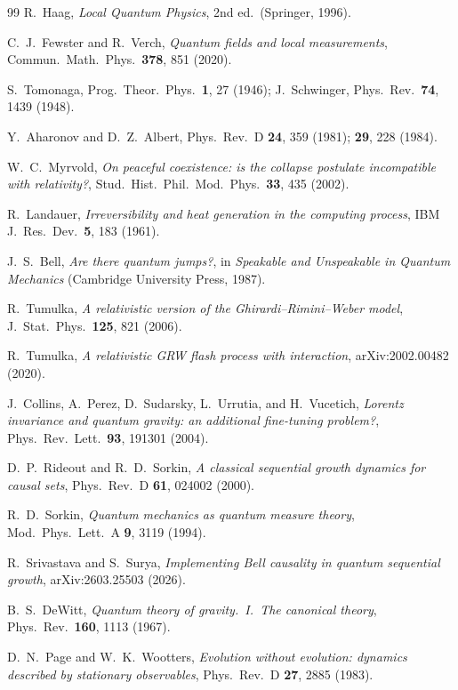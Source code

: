 \documentclass[11pt,a4paper]{article}
\theoremstyle{definition}
\theoremstyle{plain}
\theoremstyle{remark}
\begin{document}
\begin{thebibliography}{99}
 R.~Haag, \emph{Local Quantum Physics}, 2nd ed.\ (Springer,
1996).

 C.~J.~Fewster and R.~Verch, \emph{Quantum fields
and local measurements}, Commun.\ Math.\ Phys.\ \textbf{378}, 851 (2020).

 S.~Tomonaga, Prog.\ Theor.\ Phys.\ \textbf{1}, 27
(1946); J.~Schwinger, Phys.\ Rev.\ \textbf{74}, 1439 (1948).

 Y.~Aharonov and D.~Z.~Albert, Phys.\ Rev.\ D
\textbf{24}, 359 (1981); \textbf{29}, 228 (1984).

 W.~C.~Myrvold, \emph{On peaceful coexistence: is the
collapse postulate incompatible with relativity?}, Stud.\ Hist.\ Phil.\
Mod.\ Phys.\ \textbf{33}, 435 (2002).

 R.~Landauer, \emph{Irreversibility and heat generation
in the computing process}, IBM J.\ Res.\ Dev.\ \textbf{5}, 183 (1961).

 J.~S.~Bell, \emph{Are there quantum jumps?}, in
\emph{Speakable and Unspeakable in Quantum Mechanics} (Cambridge
University Press, 1987).

 R.~Tumulka, \emph{A relativistic version of the
Ghirardi--Rimini--Weber model}, J.\ Stat.\ Phys.\ \textbf{125}, 821
(2006).

 R.~Tumulka, \emph{A relativistic GRW flash process
with interaction}, arXiv:2002.00482 (2020).

 J.~Collins, A.~Perez, D.~Sudarsky, L.~Urrutia, and
H.~Vucetich, \emph{Lorentz invariance and quantum gravity: an additional
fine-tuning problem?}, Phys.\ Rev.\ Lett.\ \textbf{93}, 191301 (2004).

 D.~P.~Rideout and R.~D.~Sorkin, \emph{A classical
sequential growth dynamics for causal sets}, Phys.\ Rev.\ D \textbf{61},
024002 (2000).

 R.~D.~Sorkin, \emph{Quantum mechanics as quantum measure
theory}, Mod.\ Phys.\ Lett.\ A \textbf{9}, 3119 (1994).

 R.~Srivastava and S.~Surya, \emph{Implementing
Bell causality in quantum sequential growth}, arXiv:2603.25503 (2026).

 B.~S.~DeWitt, \emph{Quantum theory of gravity.~I.\ The
canonical theory}, Phys.\ Rev.\ \textbf{160}, 1113 (1967).

 D.~N.~Page and W.~K.~Wootters, \emph{Evolution
without evolution: dynamics described by stationary observables},
Phys.\ Rev.\ D \textbf{27}, 2885 (1983).


\end{thebibliography}
\end{document}
